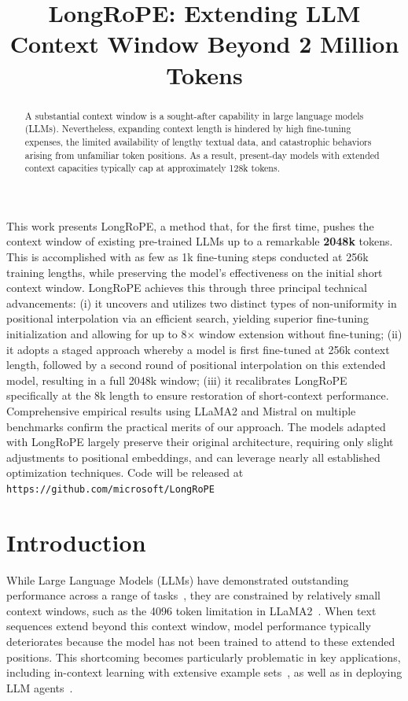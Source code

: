 \title{LongRoPE: Extending LLM Context Window Beyond 2 Million Tokens}

\begin{abstract}
A substantial context window is a sought-after capability in large language models (LLMs). Nevertheless, expanding context length is hindered by high fine-tuning expenses, the limited availability of lengthy textual data, and catastrophic behaviors arising from unfamiliar token positions. As a result, present-day models with extended context capacities typically cap at approximately 128k tokens.
\end{abstract}

This work presents LongRoPE, a method that, for the first time, pushes the context window of existing pre-trained LLMs up to a remarkable \textbf{2048k} tokens. This is accomplished with as few as 1k fine-tuning steps conducted at 256k training lengths, while preserving the model’s effectiveness on the initial short context window. LongRoPE achieves this through three principal technical advancements: (i) it uncovers and utilizes two distinct types of non-uniformity in positional interpolation via an efficient search, yielding superior fine-tuning initialization and allowing for up to 8$\times$ window extension without fine-tuning; (ii) it adopts a staged approach whereby a model is first fine-tuned at 256k context length, followed by a second round of positional interpolation on this extended model, resulting in a full 2048k window; (iii) it recalibrates LongRoPE specifically at the 8k length to ensure restoration of short-context performance. Comprehensive empirical results using LLaMA2 and Mistral on multiple benchmarks confirm the practical merits of our approach. The models adapted with LongRoPE largely preserve their original architecture, requiring only slight adjustments to positional embeddings, and can leverage nearly all established optimization techniques. Code will be released at \texttt{https://github.com/microsoft/LongRoPE}

\section{Introduction}

While Large Language Models (LLMs) have demonstrated outstanding performance across a range of tasks~\cite{gpt4,llama2}, they are constrained by relatively small context windows, such as the 4096 token limitation in LLaMA2~\cite{llama2}. When text sequences extend beyond this context window, model performance typically deteriorates because the model has not been trained to attend to these extended positions. This shortcoming becomes particularly problematic in key applications, including in-context learning with extensive example sets~\cite{Huang2023FewerIM}, as well as in deploying LLM agents~\cite{park2023generative,madaan2023selfrefine}.

